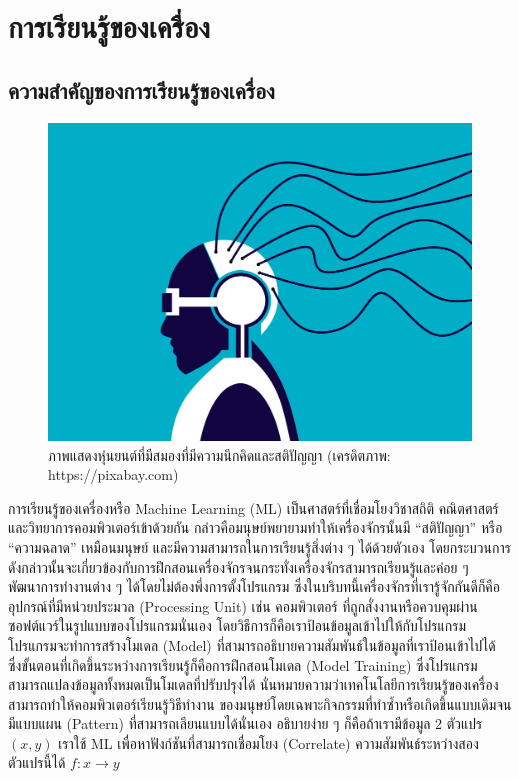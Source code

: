 

\chapter{การเรียนรู้ของเครื่อง}
\label{ch:ml}

\section{ความสำคัญของการเรียนรู้ของเครื่อง}

\begin{figure}[H]
    \centering
    \includegraphics[width=0.8\linewidth]{fig/cyborg.png}
    \caption{ภาพแสดงหุ่นยนต์ที่มีสมองที่มีความนึกคิดและสติปัญญา (เครดิตภาพ: https://pixabay.com)}
    \label{fig:cyborg}
\end{figure}

การเรียนรู้ของเครื่องหรือ Machine Learning (ML) เป็นศาสตร์ที่เชื่อมโยงวิชาสถิติ คณิตศาสตร์ และวิทยาการคอมพิวเตอร์เข้าด้วยกัน
กล่าวคือมนุษย์พยายามทำให้เครื่องจักรนั้นมี \enquote{สติปัญญา} หรือ \enquote{ความฉลาด} เหมือนมนุษย์ และมีความสามารถในการเรียนรู้สิ่งต่าง ๆ 
ได้ด้วยตัวเอง โดยกระบวนการดังกล่าวนั้นจะเกี่ยวข้องกับการฝึกสอนเครื่องจักรจนกระทั่งเครื่องจักรสามารถเรียนรู้และค่อย ๆ พัฒนาการทำงานต่าง ๆ 
ได้โดยไม่ต้องพึ่งการตั้งโปรแกรม ซึ่งในบริบทนี้เครื่องจักรที่เรารู้จักกันดีก็คืออุปกรณ์ที่มีหน่วยประมวล (Processing Unit) เช่น คอมพิวเตอร์ 
ที่ถูกสั่งงานหรือควบคุมผ่านซอฟต์แวร์ในรูปแบบของโปรแกรมนั่นเอง โดยวิธีการก็คือเราป้อนข้อมูลเข้าไปให้กับโปรแกรม โปรแกรมจะทำการสร้างโมเดล
(Model) ที่สามารถอธิบายความสัมพันธ์ในข้อมูลที่เราป้อนเข้าไปได้ ซึ่งขั้นตอนที่เกิดขึ้นระหว่างการเรียนรู้ก็คือการฝึกสอนโมเดล (Model Training) 
ซึ่งโปรแกรมสามารถแปลงข้อมูลทั้งหมดเป็นโมเดลที่ปรับปรุงได้ นั่นหมายความว่าเทคโนโลยีการเรียนรู้ของเครื่องสามารถทำให้คอมพิวเตอร์เรียนรู้วิธีทำงาน%
ของมนุษย์โดยเฉพาะกิจกรรมที่ทำซ้ำหรือเกิดขึ้นแบบเดิมจนมีแบบแผน (Pattern) ที่สามารถเลียนแบบได้นั่นเอง อธิบายง่าย ๆ ก็คือถ้าเรามีข้อมูล 2 
ตัวแปร $(x,y)$ เราใช้ ML เพื่อหาฟังก์ชันที่สามารถเชื่อมโยง (Correlate) ความสัมพันธ์ระหว่างสองตัวแปรนี้ได้ $f: x\rightarrow y$

